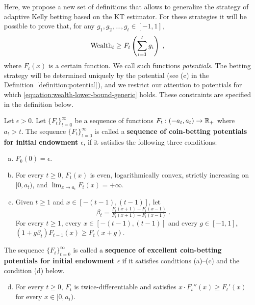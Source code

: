 Here, we propose a new set of definitions that allows to generalize the
strategy of adaptive Kelly betting based on the KT estimator. For these strategies
it will be possible to prove that, for any $g_1, g_2, \dots, g_t \in [-1,1]$,
\begin{equation}
\label{equation:wealth-lower-bound-generic}
\operatorname{Wealth}_t \ge F_t \left( \sum_{i=1}^t g_i \right) \; ,
\end{equation}
where $F_t(x)$ is a certain function. We call such functions \emph{potentials}.
The betting strategy will be determined uniquely by the potential (see (c) in
the Definition~\ref{definition:potential}), and we restrict our attention to
potentials for which \eqref{equation:wealth-lower-bound-generic} holds. These
constraints are specified in the definition below.
\begin{definition}
\label{definition:potential}
Let $\epsilon > 0$. Let $\{F_t\}_{t=0}^\infty$ be a sequence of functions
$F_t:(-a_t, a_t)  \to \mathbb{R}_+$ where $a_t > t$.  The sequence
$\{F_t\}_{t=0}^\infty$ is called a \textbf{sequence of coin-betting potentials
for initial endowment $\epsilon$}, if it satisfies the following three
conditions:
\begin{enumerate}[(a)]
\item $F_0(0) = \epsilon$.

\item For every $t \ge 0$, $F_t(x)$ is even, logarithmically convex, strictly
increasing on $[0,a_t)$, and
$\lim_{x \to a_t} F_t(x) = +\infty$.
\item Given $t \ge 1$ and $x \in [-(t-1), (t-1)]$, let
\begin{equation}
\label{equation:potential-based-strategy}
\beta_t=\tfrac{F_t(x + 1) - F_t(x - 1)}{F_t(x + 1) + F_t(x - 1)} \;.
\end{equation}
For every $t \ge 1$, every $x \in [-(t-1), (t-1)]$ and every $g \in [-1,1]$, $\left(1 + g \beta_t \right) F_{t-1}(x) \ge F_t(x+g)$.
\end{enumerate}
The sequence $\{F_t\}_{t=0}^\infty$ is called a
\textbf{sequence of excellent coin-betting potentials for initial
endowment $\epsilon$} if it satisfies conditions (a)--(c) and the condition (d)
below.
\begin{enumerate}[(a)]
\setcounter{enumi}{3}
\item For every $t \ge 0$, $F_t$ is twice-differentiable and
satisfies $x \cdot F_t''(x) \ge F_t'(x)$ for every $x \in [0,a_t)$.
\end{enumerate}
\end{definition}

